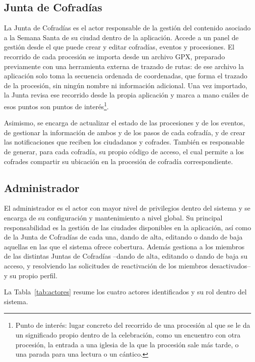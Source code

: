 \subsection{Junta de Cofradías}

La Junta de Cofradías es el actor responsable de la gestión del contenido asociado a la Semana Santa de su ciudad dentro de la aplicación. Accede a un panel de gestión desde el que puede crear y editar cofradías, eventos y procesiones. El recorrido de cada procesión se importa desde un archivo GPX, preparado previamente con una herramienta externa de trazado de rutas: de ese archivo la aplicación solo toma la secuencia ordenada de coordenadas, que forma el trazado de la procesión, sin ningún nombre ni información adicional. Una vez importado, la Junta revisa ese recorrido desde la propia aplicación y marca a mano cuáles de esos puntos son puntos de interés\footnote{Punto de interés: lugar concreto del recorrido de una procesión al que se le da un significado propio dentro de la celebración, como un encuentro con otra procesión, la entrada a una iglesia de la que la procesión sale más tarde, o una parada para una lectura o un cántico.}.

Asimismo, se encarga de actualizar el estado de las procesiones y de los eventos, de gestionar la información de ambos y de los pasos de cada cofradía, y de crear las notificaciones que reciben los ciudadanos y cofrades. También es responsable de generar, para cada cofradía, su propio código de acceso, el cual permite a los cofrades compartir su ubicación en la procesión de cofradía correspondiente.

\subsection{Administrador}

El administrador es el actor con mayor nivel de privilegios dentro del sistema y se encarga de su configuración y mantenimiento a nivel global. Su principal responsabilidad es la gestión de las ciudades disponibles en la aplicación, así como de la Junta de Cofradías de cada una, dando de alta, editando o dando de baja aquellas en las que el sistema ofrece cobertura. Además gestiona a los miembros de las distintas Juntas de Cofradías --dando de alta, editando o dando de baja su acceso, y resolviendo las solicitudes de reactivación de los miembros desactivados-- y su propio perfil.

La Tabla~\ref{tab:actores} resume los cuatro actores identificados y su rol dentro del sistema.

